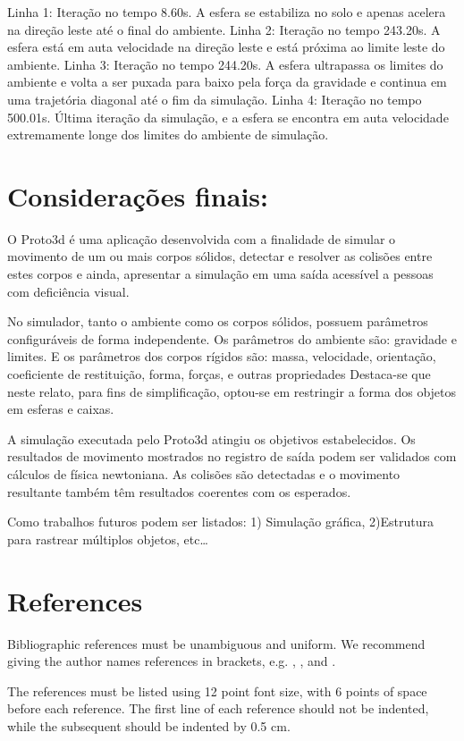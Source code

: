 \documentclass[12pt]{article}
\begin{document}
Linha 1: Iteração no tempo 8.60s. A esfera se estabiliza no solo e apenas acelera na direção leste até o final do ambiente.
Linha 2: Iteração no tempo 243.20s. A esfera está em auta velocidade na direção leste e está próxima ao limite leste do ambiente.
Linha 3: Iteração no tempo 244.20s. A esfera ultrapassa os limites do ambiente e volta a ser puxada para baixo pela força da gravidade e continua em uma trajetória diagonal até o fim da simulação.
Linha 4: Iteração no tempo 500.01s. Última iteração da simulação, e a esfera se encontra em auta velocidade extremamente longe dos limites do ambiente de simulação.

\section{ Considerações finais:}
O Proto3d é uma aplicação desenvolvida com a finalidade de simular o movimento de um ou mais corpos sólidos, detectar e resolver as colisões entre estes corpos e ainda, apresentar a simulação em uma saída acessível a pessoas com deficiência visual.

No simulador, tanto o ambiente como os corpos sólidos, possuem parâmetros configuráveis de forma independente. Os parâmetros do ambiente são:  gravidade e limites. E os parâmetros dos corpos rígidos são: massa, velocidade, orientação, coeficiente de restituição, forma, forças, e outras propriedades Destaca-se que neste relato, para fins de simplificação, optou-se em restringir a forma dos objetos em esferas e caixas.

A simulação executada pelo Proto3d atingiu os objetivos estabelecidos. Os resultados de movimento mostrados no registro de saída podem ser validados com cálculos de física newtoniana. As colisões são detectadas e o movimento resultante também têm resultados coerentes com os esperados. 

Como trabalhos futuros podem ser listados: 1) Simulação gráfica, 2)Estrutura para rastrear múltiplos objetos, etc…



\section{References}

Bibliographic references must be unambiguous and uniform.  We recommend giving
the author names references in brackets, e.g. \cite{knuth:84},
\cite{boulic:91}, and \cite{smith:99}.

The references must be listed using 12 point font size, with 6 points of space
before each reference. The first line of each reference should not be
indented, while the subsequent should be indented by 0.5 cm.



\end{document}
